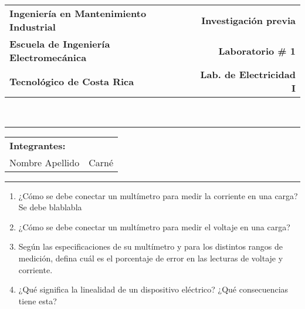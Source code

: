 \documentclass[12pt]{article}
\begin{document}
\noindent
\begin{tabularx}{\linewidth}{Xr}
\textbf{Ingeniería en Mantenimiento Industrial}& \textbf{Investigación previa} \\
\textbf{Escuela de Ingeniería Electromecánica}& \textbf{Laboratorio \# 1}\\
\textbf{Tecnológico de Costa Rica}& \textbf{Lab. de Electricidad I} \\
\end{tabularx}\\

\noindent\rule[2ex]{\textwidth}{2pt}
\begin{tabularx}{\linewidth}{Xr}
\textbf{Integrantes:} & \\
Nombre Apellido & Carné
\end{tabularx}

\noindent\rule[2ex]{\textwidth}{2pt}

\begin{enumerate}
\item ¿Cómo se debe conectar un multímetro para medir la corriente en una carga?\\
Se debe blablabla
\item	¿Cómo se debe conectar un multímetro para medir el voltaje en una carga?
\item	Según las especificaciones de su multímetro y para los distintos rangos de medición, defina cuál es el porcentaje de error en las lecturas de voltaje y corriente.
\item	¿Qué significa la linealidad de un dispositivo eléctrico? ¿Qué consecuencias tiene esta?
\end{enumerate}
\end{document}
